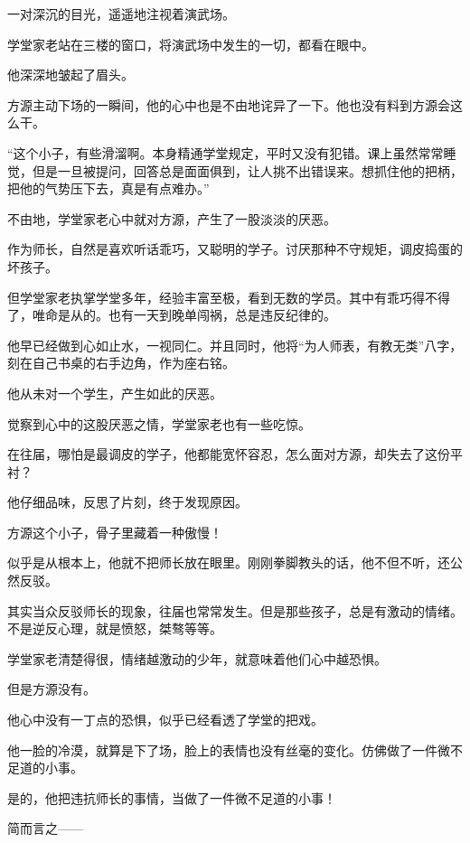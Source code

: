 
\begin{this_body}

一对深沉的目光，遥遥地注视着演武场。

学堂家老站在三楼的窗口，将演武场中发生的一切，都看在眼中。

他深深地皱起了眉头。

方源主动下场的一瞬间，他的心中也是不由地诧异了一下。他也没有料到方源会这么干。

“这个小子，有些滑溜啊。本身精通学堂规定，平时又没有犯错。课上虽然常常睡觉，但是一旦被提问，回答总是面面俱到，让人挑不出错误来。想抓住他的把柄，把他的气势压下去，真是有点难办。”

不由地，学堂家老心中就对方源，产生了一股淡淡的厌恶。

作为师长，自然是喜欢听话乖巧，又聪明的学子。讨厌那种不守规矩，调皮捣蛋的坏孩子。

但学堂家老执掌学堂多年，经验丰富至极，看到无数的学员。其中有乖巧得不得了，唯命是从的。也有一天到晚单闯祸，总是违反纪律的。

他早已经做到心如止水，一视同仁。并且同时，他将“为人师表，有教无类”八字，刻在自己书桌的右手边角，作为座右铭。

他从未对一个学生，产生如此的厌恶。

觉察到心中的这股厌恶之情，学堂家老也有一些吃惊。

在往届，哪怕是最调皮的学子，他都能宽怀容忍，怎么面对方源，却失去了这份平衬？

他仔细品味，反思了片刻，终于发现原因。

方源这个小子，骨子里藏着一种傲慢！

似乎是从根本上，他就不把师长放在眼里。刚刚拳脚教头的话，他不但不听，还公然反驳。

其实当众反驳师长的现象，往届也常常发生。但是那些孩子，总是有激动的情绪。不是逆反心理，就是愤怒，桀骜等等。

学堂家老清楚得很，情绪越激动的少年，就意味着他们心中越恐惧。

但是方源没有。

他心中没有一丁点的恐惧，似乎已经看透了学堂的把戏。

他一脸的冷漠，就算是下了场，脸上的表情也没有丝毫的变化。仿佛做了一件微不足道的小事。

是的，他把违抗师长的事情，当做了一件微不足道的小事！

简而言之——


\end{this_body}
